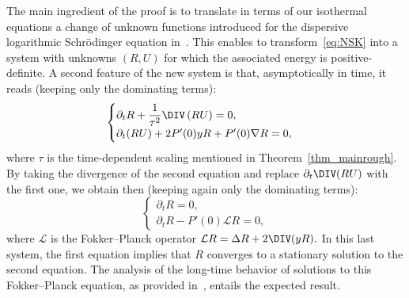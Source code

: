 The main ingredient of the proof is to translate in terms of our isothermal equations a change of unknown functions introduced for the dispersive logarithmic Schr\"odinger equation in~\cite{CaGa18}. This enables to transform~\eqref{eq:NSK} into a system with unknowns $(R,U)$ for which the associated energy is positive-definite. A second feature of the new system is that, asymptotically in time, it reads (keeping only the dominating terms):
\begin{equation}\label{eq:NSK-asymptotic}
\begin{cases}
\partial_t R + \dfrac{1}{\tau^2}\DIV\left(R U\right)=0,\\
\partial_t (R U) + 2 P'(0) y R + P'(0) \nabla R = 0,
\end{cases}
\end{equation}
where $\tau$ is the time-dependent scaling mentioned in Theorem~\ref{thm_mainrough}. By taking the divergence of the second equation and replace ${\partial_t \DIV(RU)}$ with the first one, we obtain then (keeping again only the dominating terms):
\[
\begin{cases}
\partial_t R = 0,\\
\partial_t R - P'(0) \mathcal L R = 0,
\end{cases}
\]
where $\mathcal L$ is the Fokker--Planck operator $\mathcal L R = \Delta R + 2 \DIV(y R).$ In this last system, the first equation implies that $R$ converges to a stationary solution to the second equation. The analysis of the long-time behavior of solutions to this Fokker--Planck equation, as provided in~\cite{AMTU01}, entails the expected result.

